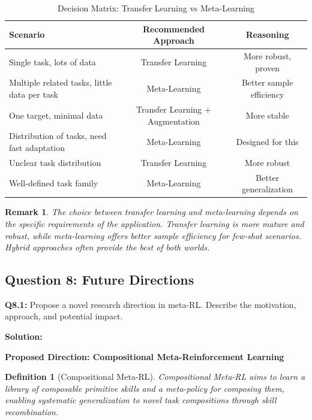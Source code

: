 \documentclass[12pt]{article}
\newcommand{\ieee}[1]{\textcolor{IEEEBlue}{\textbf{#1}}}
\newtheorem{definition}{Definition}
\newtheorem{remark}{Remark}
\begin{document}
{{			\begin{table}[H]
			\centering
			\caption{Decision Matrix: Transfer Learning vs Meta-Learning}
			\begin{tabular}{@{}lcc@{}}
			\toprule
			\textbf{Scenario} & \textbf{Recommended Approach} & \textbf{Reasoning} \\
			\midrule
			Single task, lots of data & Transfer Learning & More robust, proven \\
			Multiple related tasks, little data per task & Meta-Learning & Better sample efficiency \\
			One target, minimal data & Transfer Learning + Augmentation & More stable \\
			Distribution of tasks, need fast adaptation & Meta-Learning & Designed for this \\
			Unclear task distribution & Transfer Learning & More robust \\
			Well-defined task family & Meta-Learning & Better generalization \\
			\bottomrule
			\end{tabular}
			\label{tab:decision_matrix}
			\end{table}
			
			\begin{remark}
			The choice between transfer learning and meta-learning depends on the specific requirements of the application. Transfer learning is more mature and robust, while meta-learning offers better sample efficiency for few-shot scenarios. Hybrid approaches often provide the best of both worlds.
			\end{remark}
			
			\subsection{Question 8: Future Directions}
			
			\textbf{Q8.1:} Propose a novel research direction in meta-RL. Describe the motivation, approach, and potential impact.
			
			\textbf{Solution:}
			
			\ieee{Proposed Direction: Compositional Meta-Reinforcement Learning}
			
			\begin{definition}[Compositional Meta-RL]
			Compositional Meta-RL aims to learn a library of composable primitive skills and a meta-policy for composing them, enabling systematic generalization to novel task compositions through skill recombination.
			\end{definition}
			
}}
\end{document}
